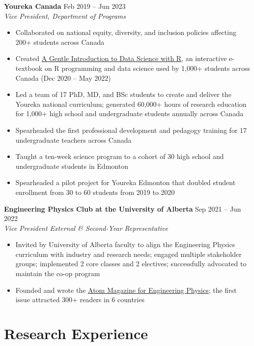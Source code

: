 \documentclass{article}
\begin{document}
\textbf{Youreka Canada} \hfill Feb 2019 -- Jun 2023 \\
\textit{Vice President, Department of Programs}
\begin{itemize}
    \item Collaborated on national equity, diversity, and inclusion policies affecting 200+ students across Canada
    \item Created \href{https://youreka-textbook.netlify.app/}{A Gentle Introduction to Data Science with R}, an interactive e-textbook on R programming and data science used by 1,000+ students across Canada (Dec 2020 -- May 2022)
    \item Led a team of 17 PhD, MD, and BSc students to create and deliver the Youreka national curriculum; generated 60,000+ hours of research education for 1,000+ high school and undergraduate students annually across Canada
    \item Spearheaded the first professional development and pedagogy training for 17 undergraduate teachers across Canada
    \item Taught a ten-week science program to a cohort of 30 high school and undergraduate students in Edmonton
    \item Spearheaded a pilot project for Youreka Edmonton that doubled student enrollment from 30 to 60 students from 2019 to 2020
\end{itemize} \vspace{1em}

\textbf{Engineering Physics Club at the University of Alberta} \hfill Sep 2021 -- Jun 2022 \\
\textit{Vice President External \& Second-Year Representative}
\begin{itemize}
    \item Invited by University of Alberta faculty to align the Engineering Physics curriculum with industry and research needs; engaged multiple stakeholder groups; implemented 2 core classes and 2 electives; successfully advocated to maintain the co-op program
    \item Founded and wrote the \href{https://atom-winter-2022.netlify.app/}{Atom Magazine for Engineering Physics}; the first issue attracted 300+ readers in 6 countries
\end{itemize}


\section*{\textcolor{my_colour}{Research Experience}}
\vspace{-.25em} \hrulefill \vspace{.25em}
\end{document}
